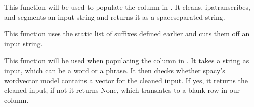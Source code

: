 \documentclass[letterpaper,10pt,english]{sphinxmanual}
\begin{document}
\sphinxAtStartPar
This function will be used to populate the column  in
. It cleans, ipa\sphinxhyphen{}transcribes, and segments
an input string and returns it as a space\sphinxhyphen{}separated string.

\begin{sphinxVerbatim}[commandchars=\\\{\}]
 
       \PYG{p}{[} \PYG{p}{]}
         
       
\end{sphinxVerbatim}

\sphinxAtStartPar
This function uses the static list of suffixes defined earlier and cuts
them off an input string.

\begin{sphinxVerbatim}[commandchars=\\\{\}]
 
      
         
\end{sphinxVerbatim}

\sphinxAtStartPar
This function will be used when populating the column  in
. It takes a string as input, which can be a word
or a phrase. It then checks whether spacy’s word\sphinxhyphen{}vector model contains a
vector for the cleaned input. If yes, it returns the cleaned input, if not
it returns None, which translates to a blank row in our column.
\end{document}
